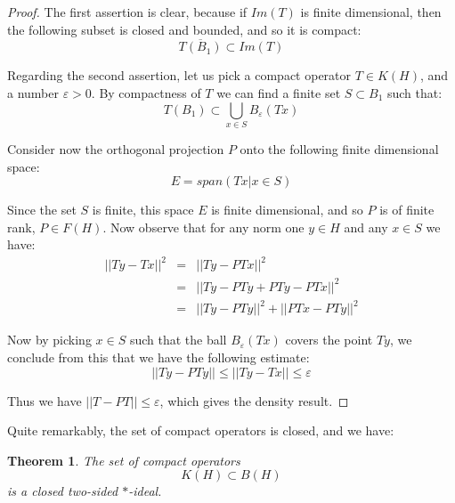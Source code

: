 \documentclass[12pt]{amsbook}
\newtheorem{theorem}{Theorem}[chapter]
\begin{document}
\begin{proof}
The first assertion is clear, because if $Im(T)$ is finite dimensional, then the following subset is closed and bounded, and so it is compact:
$$\overline{T(B_1)}\subset Im(T)$$

Regarding the second assertion, let us pick a compact operator $T\in K(H)$, and a number $\varepsilon>0$. By compactness of $T$ we can find a finite set $S\subset B_1$ such that:
$$T(B_1)\subset\bigcup_{x\in S}B_\varepsilon(Tx)$$

Consider now the orthogonal projection $P$ onto the following finite dimensional space:
$$E=span\left(Tx\Big|x\in S\right)$$

Since the set $S$ is finite, this space $E$ is finite dimensional, and so $P$ is of finite rank, $P\in F(H)$. Now observe that for any norm one $y\in H$ and any $x\in S$ we have:
\begin{eqnarray*}
||Ty-Tx||^2
&=&||Ty-PTx||^2\\
&=&||Ty-PTy+PTy-PTx||^2\\
&=&||Ty-PTy||^2+||PTx-PTy||^2
\end{eqnarray*}

Now by picking $x\in S$ such that the ball $B_\varepsilon(Tx)$ covers the point $Ty$, we conclude from this that we have the following estimate:
$$||Ty-PTy||\leq||Ty-Tx||\leq\varepsilon$$ 

Thus we have $||T-PT||\leq\varepsilon$, which gives the density result.
\end{proof}

Quite remarkably, the set of compact operators is closed, and we have:

\begin{theorem}
The set of compact operators
$$K(H)\subset B(H)$$
is a closed two-sided $*$-ideal.
\end{theorem}
\end{document}
